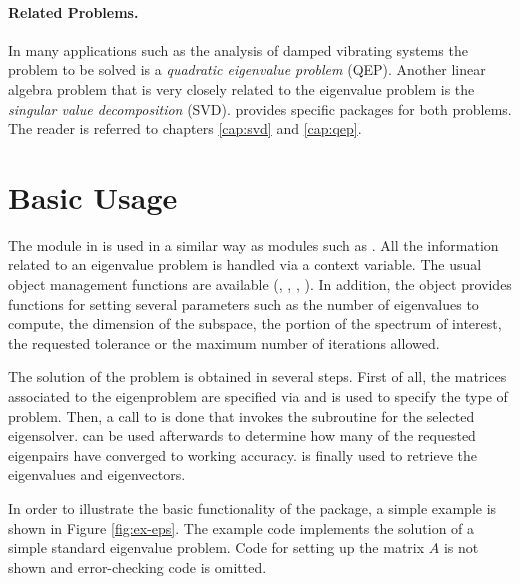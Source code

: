 \paragraph{Related Problems.}

	In many applications such as the analysis of damped vibrating systems the problem to be solved is a \emph{quadratic eigenvalue problem} (QEP). Another linear algebra problem that is very closely related to the eigenvalue problem is the {\em singular value decomposition\/} (SVD). \slepc provides specific packages for both problems. The reader is referred to chapters \ref{cap:svd} and \ref{cap:qep}.

\section{Basic Usage}

	The  module in \slepc is used in a similar way as \petsc modules such as . All the information related to an eigenvalue problem is handled via a context variable. The usual object management functions are available (, , , ). In addition, the  object provides functions for setting several parameters such as the number of eigenvalues to compute, the dimension of the subspace, the portion of the spectrum of interest, the requested tolerance or the maximum number of iterations allowed.

	The solution of the problem is obtained in several steps. First of all, the matrices associated to the eigenproblem are specified via  and  is used to specify the type of problem. Then, a call to  is done that invokes the subroutine for the selected eigensolver.  can be used afterwards to determine how many of the requested eigenpairs have converged to working accuracy.  is finally used to retrieve the eigenvalues and eigenvectors.

	In order to illustrate the basic functionality of the  package, a simple example is shown in Figure \ref{fig:ex-eps}. The example code implements the solution of a simple standard eigenvalue problem. Code for setting up the matrix $A$ is not shown and error-checking code is omitted.

